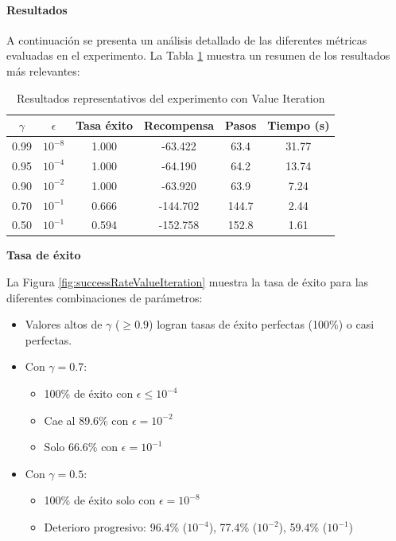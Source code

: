 \newpage

\paragraph{Resultados}

A continuación se presenta un análisis detallado de las diferentes métricas evaluadas en el experimento. La Tabla \ref{tab:resultadosValueIteration} muestra un resumen de los resultados más relevantes:

\begin{table}[H]
    \centering
    \begin{tabular}{|c|c|c|c|c|c|}
        \hline
        $\gamma$ & $\epsilon$ & Tasa éxito & Recompensa & Pasos & Tiempo (s) \\
        \hline
        0.99 & $10^{-8}$ & 1.000 & -63.422 & 63.4 & 31.77 \\
        0.95 & $10^{-4}$ & 1.000 & -64.190 & 64.2 & 13.74 \\
        0.90 & $10^{-2}$ & 1.000 & -63.920 & 63.9 & 7.24 \\
        0.70 & $10^{-1}$ & 0.666 & -144.702 & 144.7 & 2.44 \\
        0.50 & $10^{-1}$ & 0.594 & -152.758 & 152.8 & 1.61 \\
        \hline
    \end{tabular}
    \caption{Resultados representativos del experimento con Value Iteration}
    \label{tab:resultadosValueIteration}
\end{table}

\textbf{Tasa de éxito}

La Figura \ref{fig:successRateValueIteration} muestra la tasa de éxito para las diferentes combinaciones de parámetros:

\begin{itemize}
    \item Valores altos de $\gamma$ ($\geq 0.9$) logran tasas de éxito perfectas (100\%) o casi perfectas.
    \item Con $\gamma = 0.7$:
    \begin{itemize}
        \item 100\% de éxito con $\epsilon \leq 10^{-4}$
        \item Cae al 89.6\% con $\epsilon = 10^{-2}$
        \item Solo 66.6\% con $\epsilon = 10^{-1}$
    \end{itemize}
    \item Con $\gamma = 0.5$:
    \begin{itemize}
        \item 100\% de éxito solo con $\epsilon = 10^{-8}$
        \item Deterioro progresivo: 96.4\% ($10^{-4}$), 77.4\% ($10^{-2}$), 59.4\% ($10^{-1}$)
    \end{itemize}
\end{itemize}

